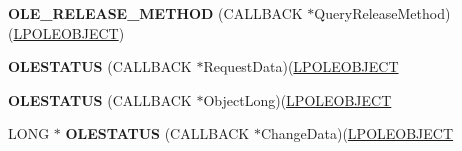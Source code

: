 \begin{DoxyCompactItemize}
{\bfseries O\+L\+E\+\_\+\+R\+E\+L\+E\+A\+S\+E\+\_\+\+M\+E\+T\+H\+OD} (C\+A\+L\+L\+B\+A\+CK $\ast$Query\+Release\+Method)(\hyperlink{struct___o_l_e_o_b_j_e_c_t}{L\+P\+O\+L\+E\+O\+B\+J\+E\+CT})
\item 
\mbox{\label{struct___o_l_e_o_b_j_e_c_t_v_t_b_l_acc5a56d5b2dcf022236ea17c3c901521}} 
{\bfseries O\+L\+E\+S\+T\+A\+T\+US} (C\+A\+L\+L\+B\+A\+CK $\ast$Request\+Data)(\hyperlink{struct___o_l_e_o_b_j_e_c_t}{L\+P\+O\+L\+E\+O\+B\+J\+E\+CT}
\item 
\mbox{\label{struct___o_l_e_o_b_j_e_c_t_v_t_b_l_a032d2123481b86c0b7f8e8984a31561f}} 
{\bfseries O\+L\+E\+S\+T\+A\+T\+US} (C\+A\+L\+L\+B\+A\+CK $\ast$Object\+Long)(\hyperlink{struct___o_l_e_o_b_j_e_c_t}{L\+P\+O\+L\+E\+O\+B\+J\+E\+CT}
\item 
\mbox{\label{struct___o_l_e_o_b_j_e_c_t_v_t_b_l_a9bee0f3cb0bbcd1da189ec06dd5e8481}} 
L\+O\+NG $\ast$ {\bfseries O\+L\+E\+S\+T\+A\+T\+US} (C\+A\+L\+L\+B\+A\+CK $\ast$Change\+Data)(\hyperlink{struct___o_l_e_o_b_j_e_c_t}{L\+P\+O\+L\+E\+O\+B\+J\+E\+CT}
\end{DoxyCompactItemize}

